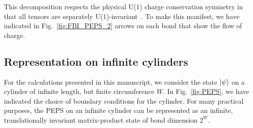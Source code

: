 This decomposition respects the physical U(1) charge conservation
symmetry in that all tensors are separately
U(1)-invariant~\cite{bauer2011}. To make this manifest, we have
indicated in Fig.~\ref{fig:FBI_PEPS_2} arrows on each bond that show
the flow of charge.

\subsection{Representation on infinite cylinders}
For the calculations presented in this manuscript, we consider the
state $\vert \psi \rangle$ on a cylinder of infinite length, but finite
circumference $W$. In Fig.~\ref{fig:PEPS}, we have indicated the
choice of boundary conditions for the cylinder. For many practical
purposes, the PEPS on an infinite cylinder can be represented as an
infinite, translationally invariant matrix-product state of bond
dimension $2^W$.

